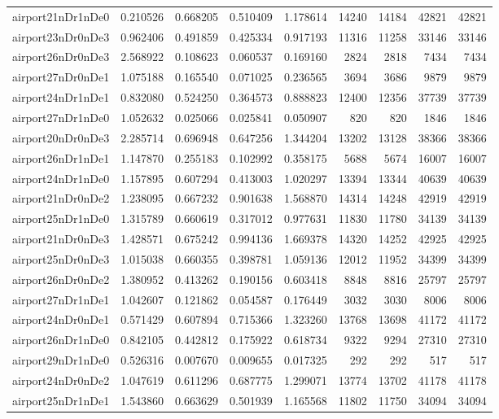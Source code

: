 \begin{longtable}{|l|r|r|r|r|r|r|r|r|}
airport21nDr1nDe0 & 0.210526 & 0.668205 & 0.510409 & 1.178614 & 14240 & 14184 & 42821 & 42821 \\
airport23nDr0nDe3 & 0.962406 & 0.491859 & 0.425334 & 0.917193 & 11316 & 11258 & 33146 & 33146 \\
airport26nDr0nDe3 & 2.568922 & 0.108623 & 0.060537 & 0.169160 & 2824 & 2818 & 7434 & 7434 \\
airport27nDr0nDe1 & 1.075188 & 0.165540 & 0.071025 & 0.236565 & 3694 & 3686 & 9879 & 9879 \\
airport24nDr1nDe1 & 0.832080 & 0.524250 & 0.364573 & 0.888823 & 12400 & 12356 & 37739 & 37739 \\
airport27nDr1nDe0 & 1.052632 & 0.025066 & 0.025841 & 0.050907 & 820 & 820 & 1846 & 1846 \\
airport20nDr0nDe3 & 2.285714 & 0.696948 & 0.647256 & 1.344204 & 13202 & 13128 & 38366 & 38366 \\
airport26nDr1nDe1 & 1.147870 & 0.255183 & 0.102992 & 0.358175 & 5688 & 5674 & 16007 & 16007 \\
airport24nDr1nDe0 & 1.157895 & 0.607294 & 0.413003 & 1.020297 & 13394 & 13344 & 40639 & 40639 \\
airport21nDr0nDe2 & 1.238095 & 0.667232 & 0.901638 & 1.568870 & 14314 & 14248 & 42919 & 42919 \\
airport25nDr1nDe0 & 1.315789 & 0.660619 & 0.317012 & 0.977631 & 11830 & 11780 & 34139 & 34139 \\
airport21nDr0nDe3 & 1.428571 & 0.675242 & 0.994136 & 1.669378 & 14320 & 14252 & 42925 & 42925 \\
airport25nDr0nDe3 & 1.015038 & 0.660355 & 0.398781 & 1.059136 & 12012 & 11952 & 34399 & 34399 \\
airport26nDr0nDe2 & 1.380952 & 0.413262 & 0.190156 & 0.603418 & 8848 & 8816 & 25797 & 25797 \\
airport27nDr1nDe1 & 1.042607 & 0.121862 & 0.054587 & 0.176449 & 3032 & 3030 & 8006 & 8006 \\
airport24nDr0nDe1 & 0.571429 & 0.607894 & 0.715366 & 1.323260 & 13768 & 13698 & 41172 & 41172 \\
airport26nDr1nDe0 & 0.842105 & 0.442812 & 0.175922 & 0.618734 & 9322 & 9294 & 27310 & 27310 \\
airport29nDr1nDe0 & 0.526316 & 0.007670 & 0.009655 & 0.017325 & 292 & 292 & 517 & 517 \\
airport24nDr0nDe2 & 1.047619 & 0.611296 & 0.687775 & 1.299071 & 13774 & 13702 & 41178 & 41178 \\
airport25nDr1nDe1 & 1.543860 & 0.663629 & 0.501939 & 1.165568 & 11802 & 11750 & 34094 & 34094 \\

\end{longtable}

